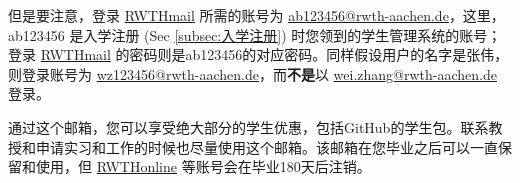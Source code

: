     但是要注意，登录 \href{https://mail.rwth-aachen.de/}{RWTHmail} 所需的账号为 \href{mailto:ab123456@rwth-aachen.de}{ab123456@rwth-aachen.de}，这里，ab123456 是入学注册 (Sec \ref{subsec:入学注册}) 时您领到的学生管理系统的账号；登录 \href{https://mail.rwth-aachen.de/}{RWTHmail} 的密码则是ab123456的对应密码。同样假设用户的名字是张伟，则登录账号为 \href{mailto:wz123456@rwth-aachen.de}{wz123456@rwth-aachen.de}，而\textbf{不是}以 \href{mailto:wei.zhang@rwth-aachen.de}{wei.zhang@rwth-aachen.de} 登录。

    通过这个邮箱，您可以享受绝大部分的学生优惠，包括GitHub的学生包。联系教授和申请实习和工作的时候也尽量使用这个邮箱。该邮箱在您毕业之后可以一直保留和使用，但 \href{https://online.rwth-aachen.de/}{RWTHonline} 等账号会在毕业180天后注销。

    \begin{figure}[ht]
      \centering

\end{figure}

